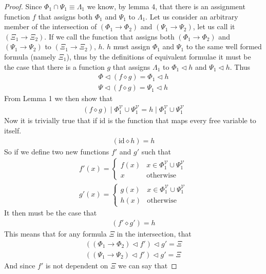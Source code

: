 \documentclass{article}
\begin{document}
\begin{proof}
Since $\Phi_1\cap \Psi_1 \equiv \Lambda_1$ we know, by lemma 4, that there is an assignment function $f$ that assigns both $\Phi_1$ and $\Psi_1$ to $\Lambda_1$.
Let us consider an arbitrary member of the intersection of $(\Phi_1\rightarrow\Phi_2)$ and $(\Psi_1\rightarrow\Psi_2)$, let us call it $(\Xi_1\rightarrow\Xi_2)$.
If we call the function that assigns both $(\Phi_1\rightarrow\Phi_2)$ and $(\Psi_1\rightarrow\Psi_2)$ to $(\Xi_1\rightarrow\Xi_2)$, $h$.
$h$ must assign $\Phi_1$ and $\Psi_1$ to the same well formed formula (namely $\Xi_1$),
thus by the definitions of equivalent formulae it must be the case that there is a function $g$ that assigns $\Lambda_1$ to $\Phi_1\lhd h$ and $\Psi_1\lhd h$.
Thus
\begin{align*}
\Phi \lhd (f\diamond g) = \Phi_1 \lhd h \\
\Psi \lhd (f\diamond g) = \Psi_1 \lhd h
\end{align*}
From Lemma 1 we then show that
\begin{align*}
(f\diamond g) \mid \Phi_1^\mathcal{V} \cup \Psi_1^\mathcal{V} = h \mid \Phi_1^\mathcal{V} \cup \Psi_1^\mathcal{V} 
\end{align*}
Now it is trivially true that if $\mathrm{id}$ is the function that maps every free variable to itself.
\begin{align*}
(\mathrm{id}\diamond h) = h
\end{align*}
So if we define two new functions $f'$ and $g'$ such that
\begin{align*}
f' (x) = \begin{cases}
f (x) & x \in \Phi_1^\mathcal{V} \cup \Psi_1^\mathcal{V} \\ 
x & \mathrm{otherwise}
\end{cases}\\
g'(x) = \begin{cases}
g (x) & x \in \Phi_1^\mathcal{V} \cup \Psi_1^\mathcal{V} \\ 
h (x) & \mathrm{otherwise}
\end{cases}
\end{align*}
It then must be the case that
\begin{align*}
(f'\diamond g') = h
\end{align*}
This means that for any formula $\Xi$ in the intersection, that
\begin{align*}
((\Phi_1\rightarrow\Phi_2)\lhd f')\lhd g' = \Xi \\
((\Psi_1\rightarrow\Psi_2)\lhd f')\lhd g' = \Xi
\end{align*}
And since $f'$ is not dependent on $\Xi$ we can say that

\end{proof}
\end{document}
